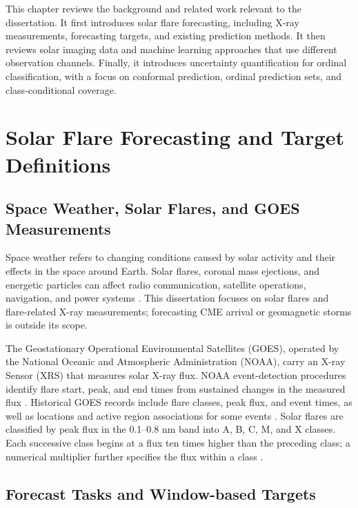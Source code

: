 \documentclass[12pt]{report}
\begin{document}
This chapter reviews the background and related work relevant to the dissertation. It first introduces solar flare forecasting, including X-ray measurements, forecasting targets, and existing prediction methods. It then reviews solar imaging data and machine learning approaches that use different observation channels. Finally, it introduces uncertainty quantification for ordinal classification, with a focus on conformal prediction, ordinal prediction sets, and class-conditional coverage.


\section{Solar Flare Forecasting and Target Definitions}

\subsection{Space Weather, Solar Flares, and GOES Measurements}

Space weather refers to changing conditions caused by solar activity and their effects in the space around Earth. Solar flares, coronal mass ejections, and energetic particles can affect radio communication, satellite operations, navigation, and power systems \citep{noaa_space_weather,noaa_space_weather_impacts}. This dissertation focuses on solar flares and flare-related X-ray measurements; forecasting CME arrival or geomagnetic storms is outside its scope.

The Geostationary Operational Environmental Satellites (GOES), operated by the National Oceanic and Atmospheric Administration (NOAA), carry an X-ray Sensor (XRS) that measures solar X-ray flux. NOAA event-detection procedures identify flare start, peak, and end times from sustained changes in the measured flux \citep{noaa_goes_xray_flux}. Historical GOES records include flare classes, peak flux, and event times, as well as locations and active region associations for some events \citep{Angryk2020}. Solar flares are classified by peak flux in the 0.1--0.8 nm band into A, B, C, M, and X classes. Each successive class begins at a flux ten times higher than the preceding class; a numerical multiplier further specifies the flux within a class \citep{Fletcher2011,noaa_solar_flares}.

\subsection{Forecast Tasks and Window-based Targets}
\end{document}
